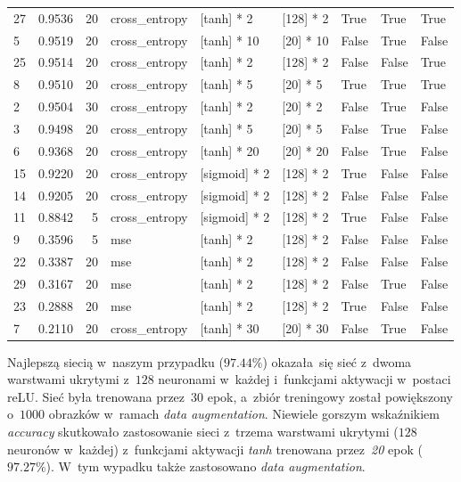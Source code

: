 \documentclass[11pt, a4paper]{article}
\begin{document}
\begin{center}
\begin{adjustbox}{angle=90}
\begin{tabular}{lrrllllll}
    27 & 0.9536 & 20 & cross\_entropy & [tanh] * 2 & [128] * 2 & True & True & True \\ 
    5 & 0.9519 & 20 & cross\_entropy & [tanh] * 10 & [20] * 10 & False & True & False \\ 
    25 & 0.9514 & 20 & cross\_entropy & [tanh] * 2 & [128] * 2 & False & False & True \\ 
    8 & 0.9510 & 20 & cross\_entropy & [tanh] * 5 & [20] * 5 & True & True & True \\ 
    2 & 0.9504 & 30 & cross\_entropy & [tanh] * 2 & [20] * 2 & False & True & False \\ 
    3 & 0.9498 & 20 & cross\_entropy & [tanh] * 5 & [20] * 5 & False & True & False \\ 
    6 & 0.9368 & 20 & cross\_entropy & [tanh] * 20 & [20] * 20 & False & True & False \\ 
    15 & 0.9220 & 20 & cross\_entropy & [sigmoid] * 2 & [128] * 2 & True & False & False \\ 
    14 & 0.9205 & 20 & cross\_entropy & [sigmoid] * 2 & [128] * 2 & False & False & False \\ 
    11 & 0.8842 & 5 & cross\_entropy & [sigmoid] * 2 & [128] * 2 & True & False & False \\ 
    9 & 0.3596 & 5 & mse & [tanh] * 2 & [128] * 2 & False & False & False \\ 
    22 & 0.3387 & 20 & mse & [tanh] * 2 & [128] * 2 & False & False & False \\ 
    29 & 0.3167 & 20 & mse & [tanh] * 2 & [128] * 2 & False & True & False \\ 
    23 & 0.2888 & 20 & mse & [tanh] * 2 & [128] * 2 & True & False & False \\ 
    7 & 0.2110 & 20 & cross\_entropy & [tanh] * 30 & [20] * 30 & False & True & False \\ 
    \end{tabular}
 \end{adjustbox}     
\end{center}
\newpage
 Najlepszą siecią w~naszym przypadku ($97.44\%$) okazała~się sieć z~dwoma warstwami ukrytymi z~$128$ neuronami w~każdej i~funkcjami aktywacji w~postaci reLU. Sieć była trenowana przez~$30$ epok, a~zbiór treningowy został powiększony o~$1000$ obrazków w~ramach \textit{data augmentation}. Niewiele gorszym wskaźnikiem \textit{accuracy} skutkowało zastosowanie sieci z~trzema warstwami ukrytymi ($128$ neuronów w~każdej) z~funkcjami aktywacji \textit{tanh} trenowana przez~\textit{20} epok ($97.27\%$). W~tym wypadku także zastosowano \textit{data augmentation}.
 
\end{document}
